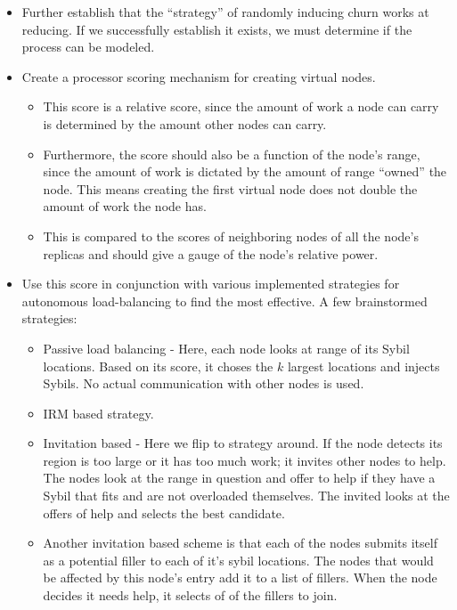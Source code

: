 \begin{itemize}
	\item Further establish that the ``strategy'' of randomly inducing churn works at reducing.
	If we successfully establish it exists,  we must determine if the process can be modeled.%
	
	\item Create a  processor scoring mechanism for creating virtual nodes.
	\begin{itemize}
		\item This score is a relative score, since the amount of work a node can carry is determined by the amount other nodes can carry.
		\item Furthermore, the score should also be a function of the node's range, since the amount of work is dictated by the amount of range ``owned'' the node. 
		This means creating the first virtual node does not double the amount of work the node has.
		\item This is compared to the scores of neighboring nodes  of all the node's replicas and should give a gauge of the node's relative  power.
	\end{itemize}
	\item Use this score in conjunction with various implemented strategies for autonomous load-balancing to find the most effective.
	A few brainstormed strategies:
	\begin{itemize}
		\item Passive load balancing -  Here, each node looks at range of its Sybil locations.
		Based on its score, it choses the $k$ largest locations and injects Sybils.
		No actual communication with other nodes is used.
		\item IRM \cite{irm} based  strategy.
		\item Invitation based -  Here we flip to strategy around.
		If the node detects its region is too large or it has too much work; it invites other nodes to help.
		The nodes look at the range in question and offer to help if they have a Sybil that fits and are not overloaded themselves.
		The invited looks at the offers of help and selects the best candidate.
		\item Another invitation based scheme is that each of the nodes submits itself as a potential filler to each of it's sybil locations.
		The nodes that would be affected by this node's entry add it to a list of fillers. 
		When the node decides it needs help, it selects of of the fillers to join.

\end{itemize}
\end{itemize}
